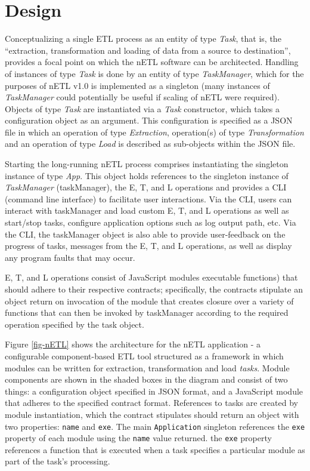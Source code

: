 \section{Design}
Conceptualizing a single ETL process as an entity of type \textit{Task}, that is, the ``extraction, transformation and loading of data from a source to destination'', provides a focal point on which the nETL software can be architected. Handling of instances of type \textit{Task} is done by an entity of type \textit{TaskManager}, which for the purposes of nETL v1.0 is implemented as a singleton (many instances of \textit{TaskManager} could potentially be useful if scaling of nETL were required). Objects of type \textit{Task} are instantiated via a \textit{Task} constructor, which takes a configuration object as an argument. This configuration is specified as a JSON file in which an operation of type \textit{Extraction}, operation(s) of type \textit{Transformation} and an operation of type \textit{Load} is described as sub-objects within the JSON file.

Starting the long-running nETL process comprises instantiating the singleton instance of type \textit{App}. This object holds references to the singleton instance of \textit{TaskManager} (taskManager), the E, T, and L operations and provides a CLI (command line interface) to facilitate user interactions. Via the CLI, users can interact with taskManager and load custom E, T, and L operations as well as start/stop tasks, configure application options such as log output path, etc. Via the CLI, the taskManager object is also able to provide user-feedback on the progress of tasks, messages from the E, T, and L operations, as well as display any program faults that may occur.

E, T, and L operations consist of JavaScript modules executable functions) that should adhere to their respective contracts; specifically, the contracts stipulate an object return on invocation of the module that creates closure over a variety of functions that can then be invoked by taskManager according to the required operation specified by the task object.


Figure \ref{fig-nETL} shows the architecture for the nETL application - a configurable component-based ETL tool structured as a framework in which modules can be written for extraction, transformation and load \textit{tasks}. Module components are shown in the shaded boxes in the diagram and consist of two things: a configuration object specified in JSON format, and a JavaScript module that adheres to the specified contract format. References to tasks are created by module instantiation, which the contract stipulates should return an object with two properties: \texttt{name} and \texttt{exe}. The main \texttt{Application} singleton references the \texttt{exe} property of each module using the \texttt{name} value returned. the \texttt{exe} property references a function that is executed when a task specifies a particular module as part of the task's processing.

